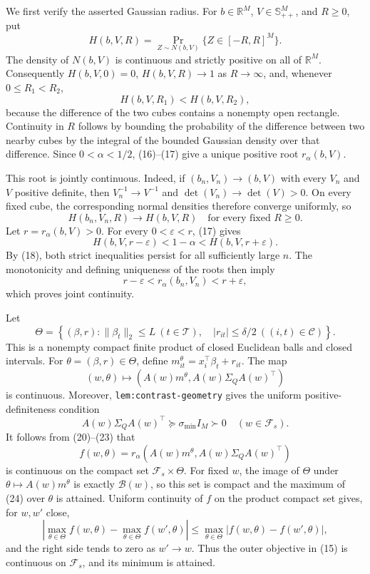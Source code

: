 We first verify the asserted Gaussian radius.  For
\(b\in\mathbb R^M\), \(V\in\mathbb S_{++}^M\), and \(R\geq0\), put
\[
 H(b,V,R)=\Pr_{Z\sim N(b,V)}\{Z\in[-R,R]^M\}. \tag{16}
\]
The density of \(N(b,V)\) is continuous and strictly positive on all of
\(\mathbb R^M\).  Consequently \(H(b,V,0)=0\),
\(H(b,V,R)\to1\) as \(R\to\infty\), and, whenever
\(0\leq R_1<R_2\),
\[
 H(b,V,R_1)<H(b,V,R_2), \tag{17}
\]
because the difference of the two cubes contains a nonempty open rectangle.
Continuity in \(R\) follows by bounding the probability of the difference
between two nearby cubes by the integral of the bounded Gaussian density over
that difference.  Since \(0<\alpha<1/2\), (16)--(17) give a unique positive
root \(r_\alpha(b,V)\).

This root is jointly continuous.  Indeed, if
\((b_n,V_n)\to(b,V)\) with every \(V_n\) and \(V\) positive definite, then
\(V_n^{-1}\to V^{-1}\) and \(\det(V_n)\to\det(V)>0\).  On every fixed cube,
the corresponding normal densities therefore converge uniformly, so
\[
 H(b_n,V_n,R)\longrightarrow H(b,V,R)
 \quad\text{for every fixed }R\geq0. \tag{18}
\]
Let \(r=r_\alpha(b,V)>0\).  For every \(0<\varepsilon<r\), (17) gives
\[
 H(b,V,r-\varepsilon)<1-\alpha<H(b,V,r+\varepsilon). \tag{19}
\]
By (18), both strict inequalities persist for all sufficiently large \(n\).
The monotonicity and defining uniqueness of the roots then imply
\[
 r-\varepsilon<r_\alpha(b_n,V_n)<r+\varepsilon, \tag{20}
\]
which proves joint continuity.

Let
\[
 \Theta=\left\{(\beta,r):
 \lVert\beta_t\rVert_2\leq L\ (t\in\mathcal T),\quad
 |r_{it}|\leq\delta/2\ ((i,t)\in\mathcal C)\right\}. \tag{21}
\]
This is a nonempty compact finite product of closed Euclidean balls and
closed intervals.  For \(\theta=(\beta,r)\in\Theta\), define
\(m^\theta_{it}=x_i^{\top}\beta_t+r_{it}\).  The map
\[
 (w,\theta)\longmapsto
 \left(A(w)m^\theta,A(w)\Sigma_QA(w)^{\top}\right) \tag{22}
\]
is continuous.  Moreover, \texttt{lem:contrast-geometry} gives the uniform
positive-definiteness condition
\[
 A(w)\Sigma_QA(w)^{\top}\succeq\sigma_{\min}I_M\succ0
 \quad(w\in\mathcal F_s). \tag{23}
\]
It follows from (20)--(23) that
\[
 f(w,\theta)=r_\alpha\!\left(
 A(w)m^\theta,A(w)\Sigma_QA(w)^{\top}\right) \tag{24}
\]
is continuous on the compact set \(\mathcal F_s\times\Theta\).
For fixed \(w\), the image of \(\Theta\) under
\(\theta\mapsto A(w)m^\theta\) is exactly \(\mathcal B(w)\), so this set
is compact and the maximum of (24) over \(\theta\) is attained.  Uniform
continuity of \(f\) on the product compact set gives, for \(w,w'\) close,
\[
 \left|\max_{\theta\in\Theta}f(w,\theta)
       -\max_{\theta\in\Theta}f(w',\theta)\right|
 \leq\max_{\theta\in\Theta}|f(w,\theta)-f(w',\theta)|, \tag{25}
\]
and the right side tends to zero as \(w'\to w\).  Thus the outer objective
in (15) is continuous on \(\mathcal F_s\), and its minimum is attained.

